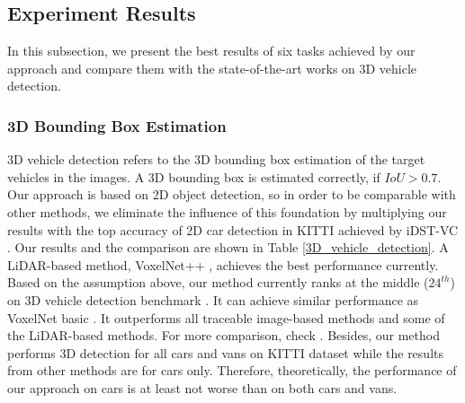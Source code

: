 \documentclass[a4paper,12pt]{article}
\begin{document}
\clearpage


\subsection{Experiment Results}
\label{exp_res}
In this subsection, we present the best results of six tasks achieved by our approach and compare them with the state-of-the-art works on 3D vehicle detection.

\subsubsection{3D Bounding Box Estimation} 
3D vehicle detection refers to the 3D bounding box estimation of the target vehicles in the images. A 3D bounding box is estimated correctly, if $IoU>0.7$. Our approach is based on 2D object detection, so in order to be comparable with other methods, we eliminate the influence of this foundation by multiplying our results with the top accuracy of 2D car detection in KITTI achieved by iDST-VC \cite{2dobject}. Our results and the comparison are shown in Table \ref{3D_vehicle_detection}. A LiDAR-based method, VoxelNet++ \cite{DBLP:journals/corr/abs-1711-06396}, achieves the best performance currently. Based on the assumption above, our method currently ranks at the middle ($24^{th}$) on 3D vehicle detection benchmark \cite{3dobject}. It can achieve similar performance as VoxelNet basic \cite{DBLP:journals/corr/abs-1711-06396}. It outperforms all traceable image-based methods and some of the LiDAR-based methods. For more comparison, check \cite{3dobject}. Besides, our method performs 3D detection for all cars and vans on KITTI dataset while the results from other methods are for cars only. Therefore, theoretically, the performance of our approach on cars is at least not worse than on both cars and vans. 
\end{document}

